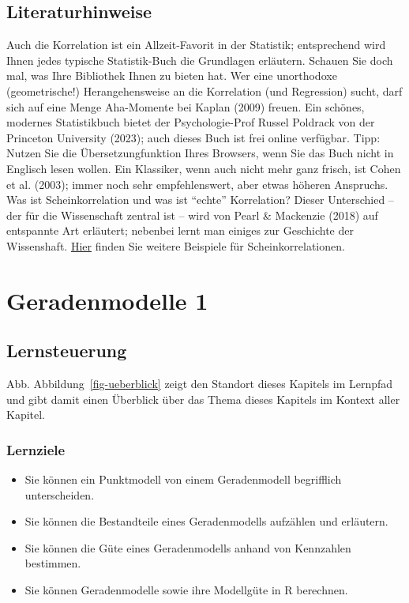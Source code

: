 \documentclass[
  a4paper,
]{scrbook}
\providecommand{\tightlist}{%
  \setlength{\itemsep}{0pt}\setlength{\parskip}{0pt}}\usepackage{longtable,booktabs,array}
\theoremstyle{definition}
\theoremstyle{definition}
\theoremstyle{definition}
\theoremstyle{remark}
\begin{document}
\section{Literaturhinweise}\label{literaturhinweise-5}

Auch die Korrelation ist ein Allzeit-Favorit in der Statistik;
entsprechend wird Ihnen jedes typische Statistik-Buch die Grundlagen
erläutern. Schauen Sie doch mal, was Ihre Bibliothek Ihnen zu bieten
hat. Wer eine unorthodoxe (geometrische!) Herangehensweise an die
Korrelation (und Regression) sucht, darf sich auf eine Menge Aha-Momente
bei Kaplan (2009) freuen. Ein schönes, modernes Statistikbuch bietet der
Psychologie-Prof Russel Poldrack von der Princeton University (2023);
auch dieses Buch ist frei online verfügbar. Tipp: Nutzen Sie die
Übersetzungfunktion Ihres Browsers, wenn Sie das Buch nicht in Englisch
lesen wollen. Ein Klassiker, wenn auch nicht mehr ganz frisch, ist Cohen
et al. (2003); immer noch sehr empfehlenswert, aber etwas höheren
Anspruchs. Was ist Scheinkorrelation und was ist ``echte'' Korrelation?
Dieser Unterschied -- der für die Wissenschaft zentral ist -- wird von
Pearl \& Mackenzie (2018) auf entspannte Art erläutert; nebenbei lernt
man einiges zur Geschichte der Wissenshaft.
\href{https://scheinkorrelation.jimdofree.com/}{Hier} finden Sie weitere
Beispiele für Scheinkorrelationen.

\chapter{Geradenmodelle 1}\label{sec-gerade1}

\section{Lernsteuerung}\label{lernsteuerung-7}

Abb. Abbildung~\ref{fig-ueberblick} zeigt den Standort dieses Kapitels
im Lernpfad und gibt damit einen Überblick über das Thema dieses
Kapitels im Kontext aller Kapitel.

\subsection{Lernziele}\label{lernziele-8}

\begin{itemize}
\tightlist
\item
  Sie können ein Punktmodell von einem Geradenmodell begrifflich
  unterscheiden.
\item
  Sie können die Bestandteile eines Geradenmodells aufzählen und
  erläutern.
\item
  Sie können die Güte eines Geradenmodells anhand von Kennzahlen
  bestimmen.
\item
  Sie können Geradenmodelle sowie ihre Modellgüte in R berechnen.
\end{itemize}
\end{document}
